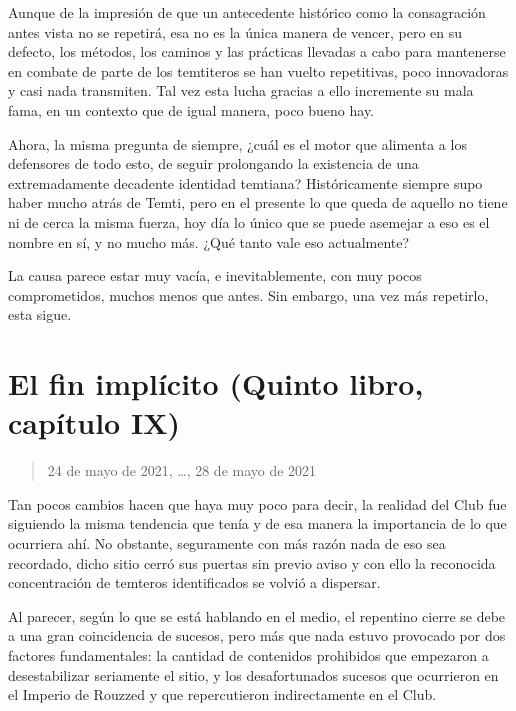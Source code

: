 \documentclass[
]{book}
\begin{document}
Aunque de la impresión de que un antecedente histórico como la consagración antes vista no se repetirá, esa no es la única manera de vencer, pero en su defecto, los métodos, los caminos y las prácticas llevadas a cabo para mantenerse en combate de parte de los temtiteros se han vuelto repetitivas, poco innovadoras y casi nada transmiten. Tal vez esta lucha gracias a ello incremente su mala fama, en un contexto que de igual manera, poco bueno hay.

Ahora, la misma pregunta de siempre, ¿cuál es el motor que alimenta a los defensores de todo esto, de seguir prolongando la existencia de una extremadamente decadente identidad temtiana? Históricamente siempre supo haber mucho atrás de Temti, pero en el presente lo que queda de aquello no tiene ni de cerca la misma fuerza, hoy día lo único que se puede asemejar a eso es el nombre en sí, y no mucho más. ¿Qué tanto vale eso actualmente?

La causa parece estar muy vacía, e inevitablemente, con muy pocos comprometidos, muchos menos que antes. Sin embargo, una vez más repetirlo, esta sigue.

\hypertarget{el-fin-impluxedcito-quinto-libro-capuxedtulo-ix}{%
\section{El fin implícito (Quinto libro, capítulo IX)}\label{el-fin-impluxedcito-quinto-libro-capuxedtulo-ix}}

\begin{quote}
24 de mayo de 2021, \ldots, 28 de mayo de 2021
\end{quote}

Tan pocos cambios hacen que haya muy poco para decir, la realidad del Club fue siguiendo la misma tendencia que tenía y de esa manera la importancia de lo que ocurriera ahí. No obstante, seguramente con más razón nada de eso sea recordado, dicho sitio cerró sus puertas sin previo aviso y con ello la reconocida concentración de temteros identificados se volvió a dispersar.

Al parecer, según lo que se está hablando en el medio, el repentino cierre se debe a una gran coincidencia de sucesos, pero más que nada estuvo provocado por dos factores fundamentales: la cantidad de contenidos prohibidos que empezaron a desestabilizar seriamente el sitio, y los desafortunados sucesos que ocurrieron en el Imperio de Rouzzed y que repercutieron indirectamente en el Club.
\end{document}
